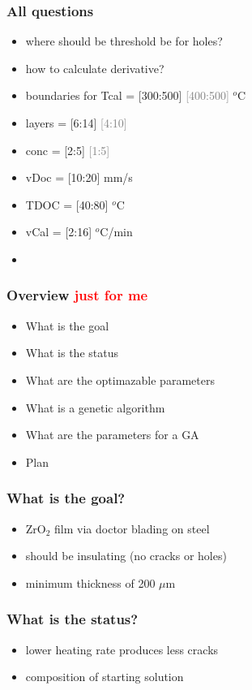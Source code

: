 \documentclass{beamer}
\newcommand{\todo}[1]{\textbf{\textcolor{red}{#1}}}
\newcommand{\me}[1]{\textcolor{gray}{#1}}
\begin{document}
\begin{frame}
	\frametitle{All questions}
	\begin{itemize}
		\item where should be threshold be for holes?
		\item how to calculate derivative?
		\item boundaries for Tcal = [300:500] \me{[400:500]} $^o$C
		\item layers  = [6:14] \me{[4:10]} 
		\item conc = [2:5] \me{[1:5]}
		\item vDoc = [10:20] mm/s
		\item TDOC = [40:80] $^o$C
		\item vCal = [2:16] $^o$C/min
		\item 
	\end{itemize}
\end{frame}

	

\iffalse
\begin{frame}
 \frametitle{Overview \todo{just for me}}
	\begin{itemize}
		\item What is the goal
		\item What is the status
		\item What are the optimazable parameters
		\item What is a genetic algorithm 
		\item What are the parameters for a GA
		\item Plan 
	\end{itemize}
\end{frame}

\begin{frame}
	\frametitle{What is the goal?}
	\begin{itemize}
		\item ZrO$_2$ film via doctor blading on steel 
		\item should be insulating (no cracks or holes)
		\item minimum thickness of 200 $\mu$m
	\end{itemize}
\end{frame}

\begin{frame}
	\frametitle{What is the status?}
	\begin{itemize}
		\item lower heating rate produces less cracks
		\item composition of starting solution
	\end{itemize}
\end{frame}
\end{document}
